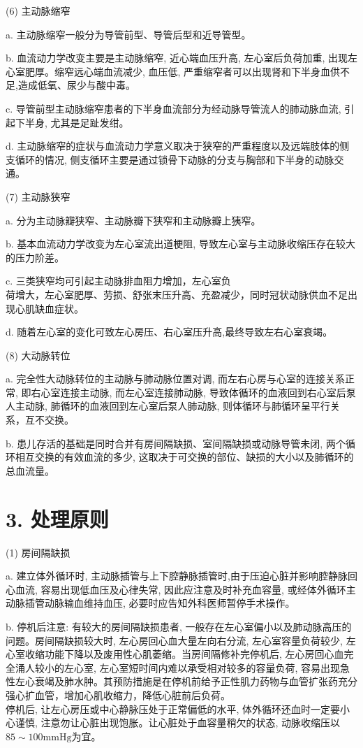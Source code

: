 \documentclass[10pt]{article}
\begin{document}
(6) 主动脉缩窄

a. 主动脉缩窄一般分为导管前型、导管后型和近导管型。

b. 血流动力学改变主要是主动脉缩窄, 近心端血压升高, 左心室后负荷加重, 出现左心室肥厚。缩窄远心端血流减少, 血压低, 严重缩窄者可以出现肾和下半身血供不足,造成低氧、尿少与酸中毒。

c. 导管前型主动脉缩窄患者的下半身血流部分为经动脉导管流人的肺动脉血流, 引起下半身, 尤其是足趾发绀。

d. 主动脉缩窄的症状与血流动力学意义取决于狭窄的严重程度以及远端肢体的侧支循环的情况, 侧支循环主要是通过锁骨下动脉的分支与胸部和下半身的动脉交通。

(7) 主动脉狭窄

a. 分为主动脉瓣狭窄、主动脉瓣下狭窄和主动脉瓣上㹫窄。

b. 基本血流动力学改变为左心室流出道梗阻, 导致左心室与主动脉收缩压存在较大的压力阶差。

c. 三类狭窄均可引起主动脉排血阻力增加，左心室负\\
荷增大，左心室肥厚、劳损、舒张末压升高、充盈减少，同时冠状动脉供血不足出现心肌缺血症状。

d. 随着左心室的变化可致左心房压、右心室压升高,最终导致左右心室衰竭。

(8) 大动脉转位

a. 完全性大动脉转位的主动脉与肺动脉位置对调, 而左右心房与心室的连接关系正常, 即右心室连接主动脉, 而左心室连接肺动脉, 导致体循环的血液回到右心室后泵人主动脉, 肺循环的血液回到左心室后泵人肺动脉, 则体循环与肺循环呈平行关系，互不交换。

b. 患儿存活的基础是同时合并有房间隔缺损、室间隔缺损或动脉导管未闭, 两个循环相互交换的有效血流的多少, 这取决于可交换的部位、缺损的大小以及肺循环的总血流量。

\section*{3. 处理原则}
(1) 房间隔缺损

a. 建立体外循环时, 主动脉插管与上下腔静脉插管时,由于压迫心脏并影响腔静脉回心血流, 容易出现低血压及心律失常, 因此应注意及时补充血容量, 或经体外循环主动脉插管动脉输血维持血压, 必要时应告知外科医师暂停手术操作。

b. 停机后注意: 有较大的房间隔缺损患者, 一般存在左心室偏小以及肺动脉高压的问题。房间隔缺损较大时, 左心房回心血大量左向右分流, 左心室容量负荷较少, 左心室收缩功能下降以及废用性心肌萎缩。当房间隔修补完停机后, 左心房回心血完全涌人较小的左心室, 左心室短时间内难以承受相对较多的容量负荷, 容易出现急性左心衰竭及肺水肿。其预防措施是在停机前给予正性肌力药物与血管扩张药充分强心扩血管，增加心肌收缩力，降低心脏前后负荷。\\
停机后, 让左心房压或中心静脉压处于正常偏低的水平, 体外循环还血时一定要小心谨慎, 注意勿让心脏出现饱胀。让心脏处于血容量稍欠的状态, 动脉收缩压以 $85 \sim 100 \mathrm{mmHg}$为宜。
\end{document}
